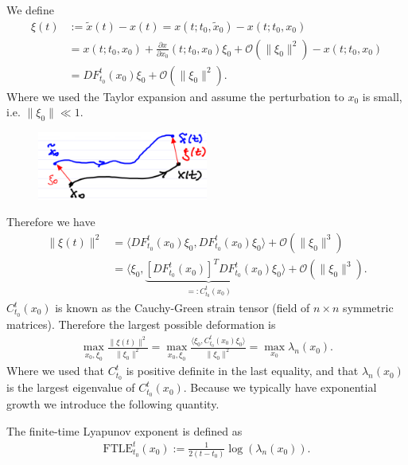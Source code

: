 \begin{ex}
	We define 
	\begin{align}
		 {\xi}(t) &:= \tilde{ {x}}(t) -  {x}(t) =  {x}(t; t_0, \tilde{ {x}}_0) -  {x}(t; t_0,  {x}_0)\\
		       &=  {x}(t; t_0,  {x}_0) + \frac{\partial  {x}}{\partial  {x}_0}(t; t_0,  {x}_0) {\xi}_0 + \mathcal{O}( \| {\xi}_0 \|^2) -  {x}(t; t_0,  {x}_0) \\
		       &= DF_{t_0}^{t}( {x}_0) {\xi}_0 + \mathcal{O}( \| {\xi}_0 \|^2).
	\end{align}
	Where we used the Taylor expansion and assume the perturbation to $ {x}_0$ is small, i.e. $ \| {\xi}_0 \| \ll 1$.
	\begin{figure}[h!]
		\centering
		\includegraphics[width=0.5\textwidth]{figures/ch1/8dispersion.png}
	\end{figure}
	Therefore we have
	\begin{align}
		 \| {\xi}(t) \|^2 &= \langle DF_{t_0}^{t}( {x}_0)  {\xi}_0, DF_{t_0}^{t}( {x}_0) {\xi}_0 \rangle + \mathcal{O}( \| {\xi}_0 \|^3) \\
			   &= \langle  {\xi}_0, \underbrace{\left[ DF_{t_0}^{t}( {x}_0) \right]^T DF_{t_0}^{t}( {x}_0)}_{=: C_{t_0}^{t}( {x}_0)}  {\xi}_0 \rangle + \mathcal{O}( \| {\xi}_0 \|^3).
	\end{align}
	$C_{t_0}^{t}( {x}_0)$ is known as the Cauchy-Green strain tensor (field of $n\times n$ symmetric matrices).
	Therefore the largest possible deformation is
	\begin{align}
		\max_{ {x}_0, {\xi}_0} \frac{ \| {\xi}(t) \|^2}{ \| {\xi}_0 \|^2} = \max_{ {x}_0,  {\xi}_0}\frac{\langle  {\xi}_0, C_{t_0}^{t}( {x}_0)  {\xi}_0 \rangle}{ \| {\xi}_0 \|^2} = \max_{ {x}_0} \lambda_{n}( {x}_0).
	\end{align}
	Where we used that $C_{t_0}^{t}$ is positive definite in the last equality, and that $\lambda_n( {x}_0)$ is the largest eigenvalue of $C_{t_0}^{t}( {x}_0)$. Because we typically have exponential growth we introduce the following quantity.	
\end{ex}
\begin{definition}
	The finite-time Lyapunov exponent is defined as
	\begin{align}
		\boxed{ \textrm{FTLE} _{t_0}^{t}( {x}_0) := \frac{1}{2(t-t_0)} \log(\lambda_n( {x}_0)).}
	\end{align}
\end{definition}
